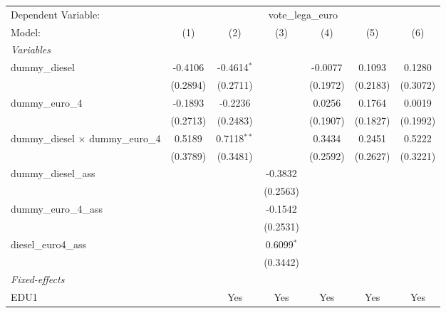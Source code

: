 
\begingroup
\centering
\begin{tabular}{lcccccc}
   \tabularnewline \midrule \midrule
   Dependent Variable: & \multicolumn{6}{c}{vote\_lega\_euro}\\
   Model:                                    & (1)      & (2)           & (3)          & (4)      & (5)      & (6)\\  
   \midrule
   \emph{Variables}\\
   dummy\_diesel                             & -0.4106  & -0.4614$^{*}$ &              & -0.0077  & 0.1093   & 0.1280\\   
                                             & (0.2894) & (0.2711)      &              & (0.1972) & (0.2183) & (0.3072)\\   
   dummy\_euro\_4                            & -0.1893  & -0.2236       &              & 0.0256   & 0.1764   & 0.0019\\   
                                             & (0.2713) & (0.2483)      &              & (0.1907) & (0.1827) & (0.1992)\\   
   dummy\_diesel $\times$ dummy\_euro\_4     & 0.5189   & 0.7118$^{**}$ &              & 0.3434   & 0.2451   & 0.5222\\   
                                             & (0.3789) & (0.3481)      &              & (0.2592) & (0.2627) & (0.3221)\\   
   dummy\_diesel\_ass                        &          &               & -0.3832      &          &          &   \\   
                                             &          &               & (0.2563)     &          &          &   \\   
   dummy\_euro\_4\_ass                       &          &               & -0.1542      &          &          &   \\   
                                             &          &               & (0.2531)     &          &          &   \\   
   diesel\_euro4\_ass                        &          &               & 0.6099$^{*}$ &          &          &   \\   
                                             &          &               & (0.3442)     &          &          &   \\   
   \midrule
   \emph{Fixed-effects}\\
   EDU1                                      &          & Yes           & Yes          & Yes      & Yes      & Yes\\  

\end{tabular}
